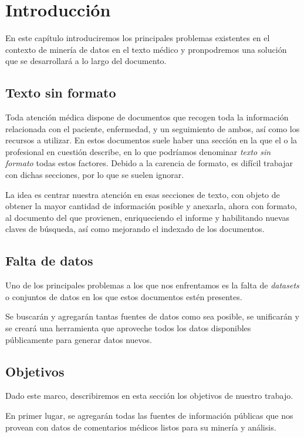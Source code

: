 \chapter{Introducción}

En este capítulo introduciremos los principales problemas existentes en el contexto de minería de datos en el texto médico y pronpodremos una solución que se desarrollará a lo largo del documento.

\section{Texto sin formato}
Toda atención médica dispone de documentos que recogen toda la información relacionada con el paciente, enfermedad, y un seguimiento de ambos, así como los recursos a utilizar. En estos documentos suele haber una sección en la que el o la profesional en cuestión describe, en lo que podríamos denominar \textit{texto sin formato} todas estos factores. Debido a la carencia de formato, es difícil trabajar con dichas secciones, por lo que se suelen ignorar.

La idea es centrar nuestra atención en esas secciones de texto, con objeto de obtener la mayor cantidad de información posible y anexarla, ahora con formato, al documento del que provienen, enriqueciendo el informe y habilitando nuevas claves de búsqueda, así como mejorando el indexado de los documentos.


\section{Falta de datos}
Uno de los principales problemas a los que nos enfrentamos es la falta de \textit{datasets} o conjuntos de datos en los que estos documentos estén presentes. 

Se buscarán y agregarán tantas fuentes de datos como sea posible, se unificarán y se creará una herramienta que aproveche todos los datos disponibles públicamente para generar datos nuevos.

\section{Objetivos}
Dado este marco, describiremos en esta sección los objetivos de nuestro trabajo.

En primer lugar, se agregarán todas las fuentes de información públicas que nos provean con datos de comentarios médicos listos para su minería y análisis.

